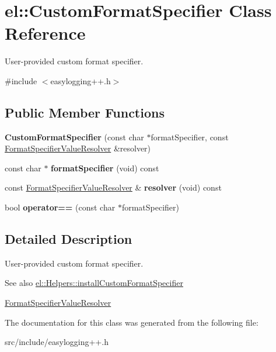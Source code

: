 \hypertarget{classel_1_1_custom_format_specifier}{}\section{el\+:\+:Custom\+Format\+Specifier Class Reference}
\label{classel_1_1_custom_format_specifier}


User-\/provided custom format specifier.  




{\ttfamily \#include $<$easylogging++.\+h$>$}

\subsection*{Public Member Functions}
\begin{DoxyCompactItemize}
\item 
\mbox{\label{classel_1_1_custom_format_specifier_a1d1bfa8b489d2908ee543023a51e58f6}} 
{\bfseries Custom\+Format\+Specifier} (const char $\ast$format\+Specifier, const \hyperlink{namespaceel_ab3cd18425a11df166a041d9024b8b5c6}{Format\+Specifier\+Value\+Resolver} \&resolver)
\item 
\mbox{\label{classel_1_1_custom_format_specifier_a471026e281855795db7df0193e43fa5a}} 
const char $\ast$ {\bfseries format\+Specifier} (void) const
\item 
\mbox{\label{classel_1_1_custom_format_specifier_a9e388356717597849bc3902835370ece}} 
const \hyperlink{namespaceel_ab3cd18425a11df166a041d9024b8b5c6}{Format\+Specifier\+Value\+Resolver} \& {\bfseries resolver} (void) const
\item 
\mbox{\label{classel_1_1_custom_format_specifier_ae17a9fbf8c5a28867308fcb8966a3aa0}} 
bool {\bfseries operator==} (const char $\ast$format\+Specifier)
\end{DoxyCompactItemize}


\subsection{Detailed Description}
User-\/provided custom format specifier. 

\begin{DoxySeeAlso}{See also}
\hyperlink{classel_1_1_helpers_aa6de15a09db4f2a6763a6652c0ea12b1}{el\+::\+Helpers\+::install\+Custom\+Format\+Specifier} 

\hyperlink{namespaceel_ab3cd18425a11df166a041d9024b8b5c6}{Format\+Specifier\+Value\+Resolver} 
\end{DoxySeeAlso}


The documentation for this class was generated from the following file\+:\begin{DoxyCompactItemize}
\item 
src/include/easylogging++.\+h\end{DoxyCompactItemize}
